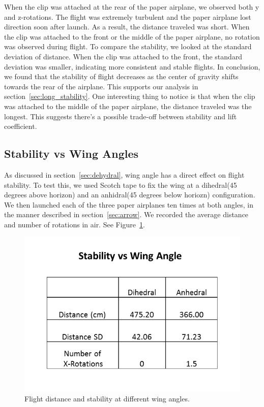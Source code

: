 When the clip was attached at the rear of the paper airplane, we observed both y and z-rotations. The flight was extremely turbulent and the paper airplane lost direction soon after launch. As a result, the distance traveled was short. When the clip was attached to the front or the middle of the paper airplane, no rotation was observed during flight. To compare the stability, we looked at the standard deviation of distance. When the clip was attached to the front, the standard deviation was smaller, indicating more consistent and stable flights. In conclusion, we found that the stability of flight decreases as the center of gravity shifts towards the rear of the airplane. This supports our analysis in section~\ref{sec:long_stability}. One interesting thing to notice is that when the clip was attached to the middle of the paper airplane, the distance traveled was the longest. This suggests there's a possible trade-off between stability and lift coefficient. 


\subsection{Stability vs Wing Angles}
As discussed in section~\ref{sec:dehydral}, wing angle has a direct effect on flight stability. To test this, we used Scotch tape to fix the wing at a dihedral(45 degrees above horizon) and an anhidral(45 degrees below horiozn) configuration. We then launched each of the three paper airplanes ten times at both angles, in the manner described in section~\ref{sec:arrow}. We recorded the average distance and number of rotations in air. See Figure~\ref{fig:angles}. 

\begin{figure}[hl]
	\centering
		\includegraphics[scale=0.5]{figures/angles.png}
		\caption{Flight distance and stability at different wing angles.}
	\label{fig:angles}
\end{figure}


